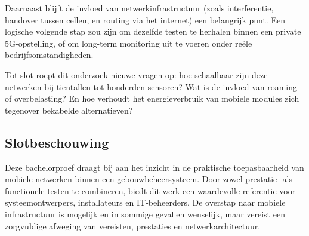 Daarnaast blijft de invloed van netwerkinfrastructuur (zoals interferentie, handover tussen cellen, en routing via het internet) een belangrijk punt. Een logische volgende stap zou zijn om dezelfde testen te herhalen binnen een private 5G-opstelling, of om long-term monitoring uit te voeren onder reële bedrijfsomstandigheden.

Tot slot roept dit onderzoek nieuwe vragen op: hoe schaalbaar zijn deze netwerken bij tientallen tot honderden sensoren? Wat is de invloed van roaming of overbelasting? En hoe verhoudt het energieverbruik van mobiele modules zich tegenover bekabelde alternatieven?

\subsection{Slotbeschouwing}

Deze bachelorproef draagt bij aan het inzicht in de praktische toepasbaarheid van mobiele netwerken binnen een gebouwbeheersysteem. Door zowel prestatie- als functionele testen te combineren, biedt dit werk een waardevolle referentie voor systeemontwerpers, installateurs en IT-beheerders. De overstap naar mobiele infrastructuur is mogelijk en in sommige gevallen wenselijk, maar vereist een zorgvuldige afweging van vereisten, prestaties en netwerkarchitectuur.
